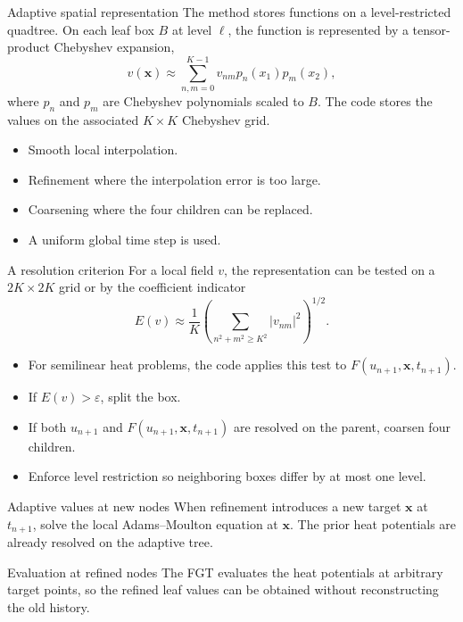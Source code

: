\documentclass[aspectratio=169,10pt]{beamer}
\newcommand{\x}{\bm{x}}
\begin{document}
\begin{frame}{Adaptive spatial representation}
\small
The method stores functions on a level-restricted quadtree.
On each leaf box $B$ at level $\ell$, the function is represented by a
tensor-product Chebyshev expansion,
\[
  v(\x)\approx\sum_{n,m=0}^{K-1}v_{nm}p_n(x_1)p_m(x_2),
\]
where $p_n$ and $p_m$ are Chebyshev polynomials scaled to $B$. The code stores
the values on the associated $K\times K$ Chebyshev grid.

\begin{itemize}
  \item Smooth local interpolation.
  \item Refinement where the interpolation error is too large.
  \item Coarsening where the four children can be replaced.
  \item A uniform global time step is used.
\end{itemize}
\end{frame}

\begin{frame}{A resolution criterion}
\small
For a local field $v$, the representation can be tested on a $2K\times2K$
grid or by the coefficient
indicator
\[
  E(v)\approx\frac{1}{K}
  \left(\sum_{n^2+m^2\ge K^2}|v_{nm}|^2\right)^{1/2}.
\]

\begin{itemize}
  \item For semilinear heat problems, the code applies this test to
  $F(u_{n+1},\x,t_{n+1})$.
  \item If $E(v)>\varepsilon$, split the box.
  \item If both $u_{n+1}$ and $F(u_{n+1},\x,t_{n+1})$ are resolved on the
  parent, coarsen four children.
  \item Enforce level restriction so neighboring boxes differ by at most one level.
\end{itemize}

\end{frame}

\begin{frame}{Adaptive values at new nodes}
\small
When refinement introduces a new target $\x$ at $t_{n+1}$, solve the local
Adams--Moulton equation at $\x$. The prior heat potentials are already
resolved on the adaptive tree.

\begin{block}{Evaluation at refined nodes}
The FGT evaluates the heat potentials at arbitrary target points, so the
refined leaf values can be obtained without reconstructing the old history.
\end{block}
\end{frame}
\end{document}

